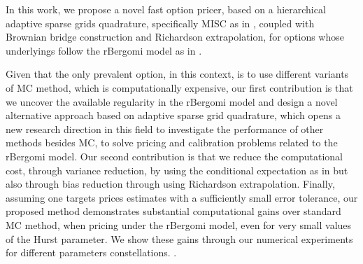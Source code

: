 In this work,  we propose a novel fast option pricer,  based on a  hierarchical adaptive sparse grids quadrature, specifically  MISC as in  \cite{haji2016multi}, coupled with Brownian bridge construction and Richardson extrapolation, for options whose underlyings  follow the rBergomi model as in \cite{bayer2016pricing}. 



Given that the only prevalent option, in this context, is to use different variants of MC method, which is computationally expensive, our first contribution  is that we uncover the available regularity in the rBergomi model and  design a novel alternative approach based on  adaptive sparse grid quadrature, which opens a new research direction in this field to investigate the performance of other methods besides MC, to solve pricing and calibration problems related to the rBergomi model. Our second contribution is that we reduce the computational cost, through variance reduction,  by using the conditional expectation as in \cite{mccrickerd2017turbocharging} but also through bias reduction through using Richardson extrapolation. Finally, assuming one targets prices estimates with a sufficiently small error tolerance, our proposed method demonstrates substantial computational gains  over standard MC method, when pricing under the rBergomi model, even for very small values of the Hurst parameter. We show  these gains through our numerical experiments for  different parameters constellations.  .


